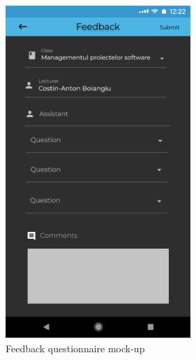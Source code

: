 \begin{figure}[!ht]
\begin{minipage}[b]{0.318\textwidth}
            \captionsetup{justification=centering}
            \includegraphics[width=\textwidth]{figures/app/initial/form.png}
            \caption{Feedback questionnaire mock-up}
            \label{4:fig:figma_form}
        \end{minipage}
        \hfill
        \begin{minipage}[b]{0.321\textwidth}
            \captionsetup{justification=centering}

\end{minipage}
\end{figure}
